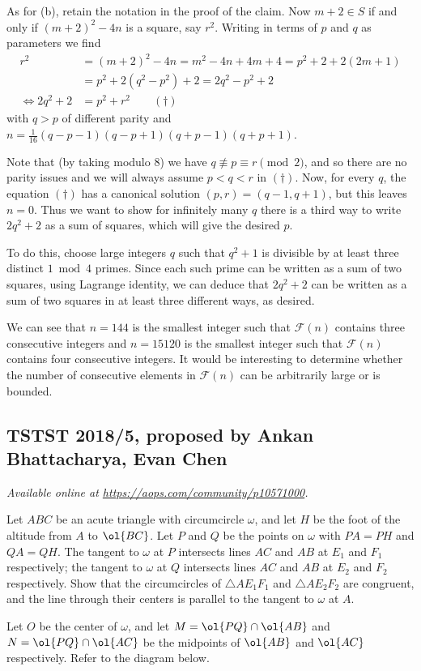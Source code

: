 \documentclass[11pt]{scrartcl}
\begin{document}
As for (b), retain the notation in the proof of the claim.
Now $m+2 \in S$ if and only if
$(m+2)^2 - 4n$ is a square, say $r^2$.
Writing in terms of $p$ and $q$ as parameters we find
\begin{align*}
  r^2 &= (m+2)^2 - 4n = m^2-4n + 4m + 4 = p^2 + 2 + 2(2m+1) \\
  &= p^2 + 2(q^2-p^2) + 2 = 2q^2 - p^2 + 2 \\
  \iff 2q^2 + 2 &= p^2 + r^2 \qquad (\dagger)
\end{align*}
with $q > p$ of different parity
and $n = \frac{1}{16} (q-p-1)(q-p+1)(q+p-1)(q+p+1)$.

Note that (by taking modulo $8$) we have $q \not\equiv p \equiv r \pmod 2$,
and so there are no parity issues
and we will always assume $p < q < r$ in $(\dagger)$.
Now, for every $q$, the equation $(\dagger)$
has a canonical solution $(p,r) = (q-1, q+1)$, but this leaves $n = 0$.
Thus we want to show for infinitely many $q$
there is a third way to write $2q^2+2$ as a sum of squares,
which will give the desired $p$.

To do this, choose large integers $q$ such that $q^2+1$
is divisible by at least three distinct $1\bmod4$ primes.
Since each such prime can be written
as a sum of two squares, using Lagrange identity,
we can deduce that $2q^2+2$ can be written as a sum of
two squares in at least three different ways, as desired.

\begin{remark*}
  We can see that $n=144$ is the smallest integer
  such that $\mathcal F(n)$ contains three consecutive integers
  and $n=15120$ is the smallest integer such that $\mathcal F(n)$
  contains four consecutive integers.
  It would be interesting to determine whether
  the number of consecutive elements in $\mathcal F(n)$
  can be arbitrarily large or is bounded.
\end{remark*}
\pagebreak

\subsection{TSTST 2018/5, proposed by Ankan Bhattacharya, Evan Chen}
\textsl{Available online at \url{https://aops.com/community/p10571000}.}
\begin{mdframed}[style=mdpurplebox,frametitle={Problem statement}]
Let $ABC$ be an acute triangle with circumcircle $\omega$,
and let $H$ be the foot of the altitude from $A$ to $\ol{BC}$.
Let $P$ and $Q$ be the points on $\omega$ with $PA = PH$ and $QA = QH$.
The tangent to $\omega$ at $P$ intersects lines $AC$ and $AB$
at $E_1$ and $F_1$ respectively; the tangent to $\omega$ at $Q$
intersects lines $AC$ and $AB$ at $E_2$ and $F_2$ respectively.
Show that the circumcircles of $\triangle AE_1F_1$ and $\triangle AE_2F_2$
are congruent, and the line through their centers
is parallel to the tangent to $\omega$ at $A$.
\end{mdframed}
Let $O$ be the center of $\omega$,
and let $M = \ol{PQ} \cap \ol{AB}$ and $N = \ol{PQ} \cap \ol{AC}$
be the midpoints of $\ol{AB}$ and $\ol{AC}$ respectively.
Refer to the diagram below.
\end{document}
